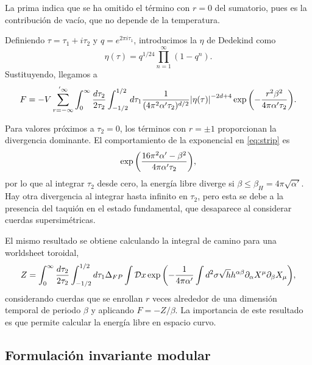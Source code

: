 La prima indica que se ha omitido el término con $r=0$ del sumatorio, pues es la contribución
de vacío, que no depende de la temperatura.

Definiendo $\tau=\tau_1+i\tau_2$ y $q=e^{2\pi i\tau_1}$, introducimos la $\eta$ de 
Dedekind como
\begin{equation}
  \eta(\tau)=q^{1/24}\prod_{n=1}^{\infty} (1-q^n).
\end{equation}
Sustituyendo, llegamos a 
\begin{equation}
  F=-V \sum_{r=-\infty}^{'\infty} \int_0^\infty\frac{d\tau_2}{2\tau_2} \int_{-1/2}^{1/2} d\tau_1  \frac{1}{(4\pi^2\alpha'\tau_2)^{d/2}}
  \abs{\eta(\tau)}^{-2d+4}\exp\qty(-\frac{r^2\beta^2}{4\pi\alpha'\tau_2}).
  \label{eq:strip}
\end{equation}

Para valores próximos a $\tau_2=0$, los términos con $r=\pm 1$ proporcionan la divergencia 
dominante.
El comportamiento de la exponencial en \ref{eq:strip} es
\begin{equation}
  \exp\qty(\frac{16\pi^2 \alpha' -\beta^2}{4\pi\alpha'\tau_2}),
\end{equation}
por lo que al integrar $\tau_2$ desde cero, la energía libre diverge si $\beta\leq \beta_H=4\pi\sqrt{\alpha'}$.
Hay otra divergencia al integrar hasta infinito en $\tau_2$, pero esta se debe a la presencia 
del taquión en el estado fundamental, que desaparece al considerar cuerdas supersimétricas.

El mismo resultado se obtiene calculando la integral de camino para una worldsheet toroidal,
\begin{equation}
  Z= \int_0^\infty\frac{d\tau_2}{2\tau_2} \int_{-1/2}^{1/2} d\tau_1 \Delta_{FP} \int \mathcal Dx
  \exp\qty(-\frac{1}{4\pi\alpha'}\int d^2\sigma \sqrt h h^{\alpha\beta}\partial_\alpha X^\mu \partial_\beta X_\mu),
\end{equation}
considerando cuerdas que se enrollan $r$ veces alrededor de una dimensión temporal de periodo $\beta$
y aplicando $F=-Z/\beta$.
La importancia de este resultado es que permite calcular la energía libre en espacio curvo.

\subsection{Formulación invariante modular}
\label{sec:taq}


